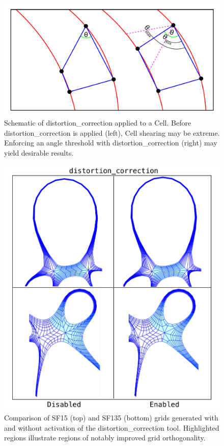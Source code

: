 \begin{figure}[H]
    \centering
    \includegraphics[width=\linewidth]{figures/cell_shearing_diagram.pdf}
    \caption{Schematic of distortion\_correction applied to a Cell. Before distortion\_correction is applied (left), Cell shearing may be extreme. Enforcing an angle threshold with distortion\_correction (right) may yield desirable results.}
    \label{fig:cell_shearing}
\end{figure}

\begin{figure}[H]
    \centering
    \includegraphics[width=\linewidth]{figures/distortion_correction.pdf}
    \caption{Comparison of SF15 (top) and SF135 (bottom) grids generated with and without activation of the distortion\_correction tool. Highlighted regions illustrate regions of notably improved grid orthogonality.}
    \label{fig:distortion_correction}
\end{figure}

